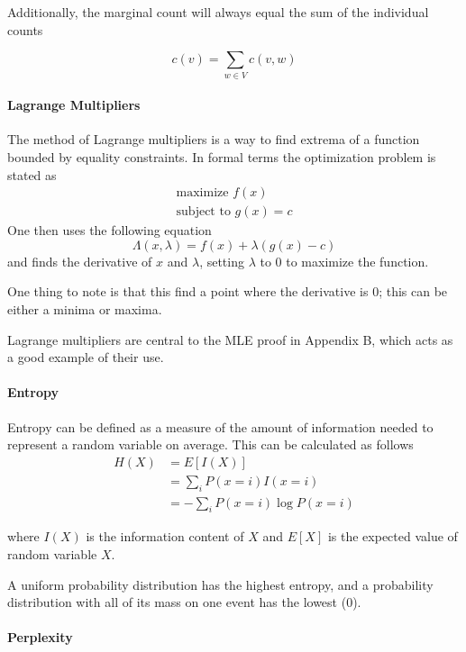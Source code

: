 \documentclass[11pt]{article}
\begin{document}
Additionally, the marginal count will always equal the sum of the individual counts

$$ c\left(v\right) = \sum\limits_{w \in V} c\left(v, w\right) $$

\paragraph{Lagrange Multipliers}

The method of Lagrange multipliers is a way to find extrema of a function bounded by equality constraints. In formal terms the optimization problem is stated as
\begin{gather*}
\text{maximize } f\left(x\right) \\
\text{subject to } g\left(x\right) = c
\end{gather*}
One then uses the following equation
$$ \Lambda\left(x, \lambda \right) = f\left(x\right) + \lambda\left(g\left(x\right) - c \right) $$
and finds the derivative of $x$ and $\lambda$, setting $\lambda$ to 0 to maximize the function.

One thing to note is that this find a point where the derivative is 0; this can be either a minima or maxima. 

Lagrange multipliers are central to the MLE proof in Appendix B, which acts as a good example of their use.

\paragraph{Entropy}
Entropy can be defined as a measure of the amount of information needed to represent a random variable on average. This can be calculated as follows
\begin{align*}
H\left(X\right) &= E\left[I\left(X\right)\right] \\
&= \sum\limits_i P\left(x=i\right) I\left(x=i\right) \\
&= - \sum\limits_i P\left(x=i\right) \log P\left(x=i\right)
\end{align*}

where $I\left(X\right)$ is the information content of $X$ and $E\left[X\right]$ is the expected value of random variable $X$.

A uniform probability distribution has the highest entropy, and a probability distribution with all of its mass on one event has the lowest (0).

\paragraph{Perplexity}
\end{document}
